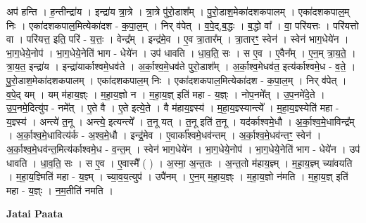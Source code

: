 \documentclass[17pt]{extarticle}
\begin{document}
अप॑ हन्ति । ह॒न्तीन्द्रा॑य । इन्द्रा॑य त्रा॒त्रे । त्रा॒त्रे पु॑रो॒डाश᳚म् । पु॒रो॒डाश॒मेका॑दशकपालम् । एका॑दशकपाल॒म् निः । एका॑दशकपाल॒मित्येका॑दश - क॒पा॒ल॒म् । निर् व॑पेत् । व॒पे॒द्,ब॒द्धः । ब॒द्धो वा᳚ । वा॒ परि॑यत्तः । परि॑यत्तो वा । परि॑यत्त॒ इति॒ परि॑ - य॒त्तः॒ । वेन्द्र᳚म् । इन्द्र॑मे॒व । ए॒व त्रा॒तार᳚म् । त्रा॒तारꣳ॒॒ स्वेन॑ । स्वेन॑ भाग॒धेये॑न । भा॒ग॒धेये॒नोप॑ । भा॒ग॒धेये॒नेति॑ भाग - धेये॑न । उप॑ धावति । धा॒व॒ति॒ सः । स ए॒व । ए॒वैन᳚म् । ए॒न॒म् त्रा॒य॒ते॒ । त्रा॒य॒त॒ इन्द्रा॑य । इन्द्रा॑यार्काश्वमे॒धव॑ते । अ॒र्का॒श्व॒मे॒धव॑ते पुरो॒डाश᳚म् । अ॒र्का॒श्व॒मेधव॑त॒ इत्य॑र्काश्वमे॒ध - व॒ते॒ । पु॒रो॒डाश॒मेका॑दशकपालम् । एका॑दशकपाल॒म् निः । एका॑दशकपाल॒मित्येका॑दश - क॒पा॒ल॒म् । निर् व॑पेत् । व॒पे॒द् यम् । यम् म॑हाय॒ज्ञ्ः । म॒हा॒य॒ज्ञो न । म॒हा॒य॒ज्ञ् इति॑ महा - य॒ज्ञ्ः । नोप॒नमे᳚त् । उ॒प॒नमे॑दे॒ते । उ॒प॒नमे॒दित्यु॑प - नमे᳚त् । ए॒ते वै । ए॒ते इत्ये॒ते । वै म॑हाय॒ज्ञ्स्य॑ । म॒हा॒य॒ज्ञ्स्यान्त्ये᳚ । म॒हा॒य॒ज्ञ्स्येति॑ महा - य॒ज्ञ्स्य॑ । अन्त्ये॑ त॒नू । अन्त्ये॒ इत्यन्त्ये᳚ । त॒नू यत् । त॒नू इति॑ त॒नू । यद॑र्काश्वमे॒धौ । अ॒र्का॒श्व॒मे॒धाविन्द्र᳚म् । अ॒र्का॒श्व॒मे॒धावित्य॑र्क - अ॒श्व॒मे॒धौ । इन्द्र॒॑मेव । ए॒वार्का᳚श्वमे॒धव॑न्तम् । अ॒र्का॒श्व॒मे॒धव॑न्तꣳ॒॒ स्वेन॑ । अ॒र्का॒श्व॒मे॒धव॑न्त॒मित्य॑र्काश्वमे॒ध - व॒न्त॒म् । स्वेन॑ भाग॒धेये॑न । भा॒ग॒धेये॒नोप॑ । भा॒ग॒धेये॒नेति॑ भाग - धेये॑न । उप॑ धावति । धा॒व॒ति॒ सः । स ए॒व । ए॒वास्मै᳚ ( ) । अ॒स्मा॒ अ॒न्त॒तः । अ॒न्त॒तो म॑हाय॒ज्ञ्म् । म॒हा॒य॒ज्ञ्म् च्या॑वयति । म॒हा॒य॒ज्ञ्मिति॑ महा - य॒ज्ञ्म् । च्या॒व॒य॒त्युप॑ । उपै॑नम् । ए॒न॒म् म॒हा॒य॒ज्ञ्ः । म॒हा॒य॒ज्ञो न॑मति । म॒हा॒य॒ज्ञ् इति॑ महा - य॒ज्ञ्ः । न॒म॒तीति॑ नमति । \newline

\textbf{Jatai Paata} \newline
\end{document}
